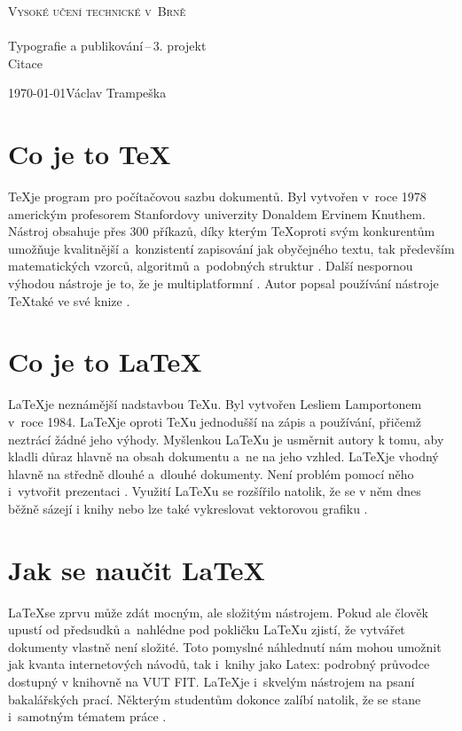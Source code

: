 \documentclass[a4paper,11pt]{article}
\begin{document}
\begin{titlepage}
\begin{center}
{\Huge\textsc{Vysoké učení technické v~Brně}}\\
\\
{\LARGE Typografie a publikování\,--\,3. projekt}\\
\Huge {Citace\\}
\end{center}
{\Large\today\hfill Václav Trampeška}
\end{titlepage}

\section{Co je to \TeX}
\TeX je program pro počítačovou sazbu dokumentů. Byl vytvořen v~roce 1978 americkým profesorem Stanfordovy univerzity Donaldem Ervinem Knuthem. Nástroj obsahuje přes 300 příkazů, díky kterým \TeX oproti svým konkurentům umožňuje kvalitnější a~konzistentí zapisování jak obyčejného textu, tak především matematických vzorců, algoritmů a~podobných struktur \cite{tex_online}. Další nespornou výhodou nástroje je to, že je multiplatformní \cite{clanek1}. Autor popsal používání nástroje \TeX také ve své knize \cite{tex_book}.

\section{Co je to \LaTeX}
\LaTeX je neznámější nadstavbou \TeX u. Byl vytvořen Lesliem Lamportonem v~roce 1984. \LaTeX je oproti \TeX u jednodušší na zápis a používání, přičemž neztrácí žádné jeho výhody. Myšlenkou \LaTeX u je usměrnit autory k tomu, aby kladli důraz hlavně na obsah dokumentu a~ne na jeho vzhled. \cite{latex_about} \LaTeX je vhodný hlavně na středně dlouhé a~dlouhé dokumenty. Není problém pomocí něho i~vytvořit prezentaci \cite{clanek2}. Využití \LaTeX u se rozšířilo natolik, že se v něm dnes běžně sázejí i knihy \cite{tex_online2} nebo lze také vykreslovat vektorovou grafiku \cite{serial}.

\section{Jak se naučit \LaTeX}
\LaTeX se zprvu může zdát mocným, ale složitým nástrojem. Pokud ale člověk upustí od předsudků a~nahlédne pod pokličku \LaTeX u zjistí, že vytvářet dokumenty vlastně není složité. Toto pomyslné náhlednutí nám mohou umožnit jak kvanta internetových návodů, tak i~knihy jako Latex: podrobný průvodce\cite{latex_pruvodce} dostupný v knihovně na VUT FIT. \LaTeX je i~skvelým nástrojem na psaní bakalářských prací. Některým studentům dokonce zalíbí natolik, že se stane i~samotným tématem práce \cite{prace1}\cite{prace2}.


\newpage
\renewcommand{\refname}{Reference}


\end{document}
